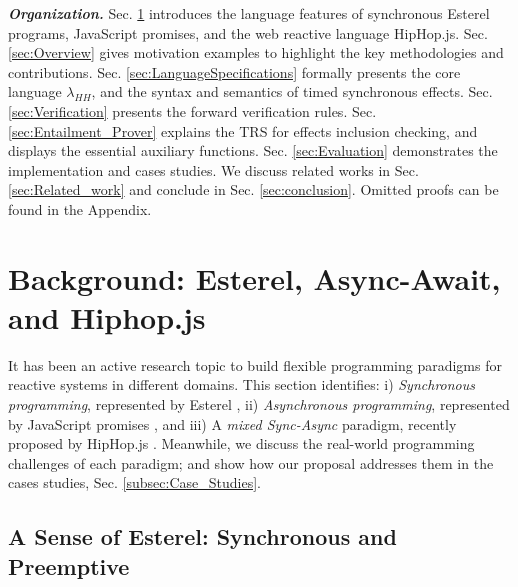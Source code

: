 \documentclass[acmsmall,review,anonymous]{acmart}\settopmatter{printfolios=true,printccs=false,printacmref=false}
\newcommand{\code}[1]{{\tt{\ensuremath{\m{#1}}}}}
\newcommand{\m}{\mathit}
\newcommand\secref[1]{Sec. \textcolor{black}{\ref{#1}}}
\begin{document}
\noindent\textbf{\textit{Organization.}} 
\secref{sec:Preliminaries} introduces the language features of synchronous Esterel programs, JavaScript promises, and the web reactive language HipHop.js. 
\secref{sec:Overview} gives motivation examples to highlight the key methodologies and contributions. 
\secref{sec:LanguageSpecifications} formally presents the core   language \code{\lambda_{HH}}, and the syntax and semantics of timed synchronous effects.
\secref{sec:Verification} presents the forward verification rules.
\secref{sec:Entailment_Prover} explains the TRS for effects inclusion checking, and displays the essential auxiliary functions. 
\secref{sec:Evaluation} demonstrates the implementation and cases studies. %
We discuss related works in \secref{sec:Related_work} and conclude in  \secref{sec:conclusion}. Omitted proofs can be found in the Appendix.


\section{Background: Esterel, Async-Await, and Hiphop.js }
\label{sec:Preliminaries}

It has been an active research topic to build flexible programming paradigms for reactive systems in different domains. This section identifies: i) \emph{Synchronous programming}, represented by Esterel  \cite{berry1992esterel}, ii) \emph{Asynchronous programming}, represented by JavaScript promises \cite{madsen2017model}, and iii) A \emph{mixed Sync-Async} paradigm, recently proposed by HipHop.js  \cite{berry2020hiphop}. Meanwhile, we discuss the real-world programming challenges of each paradigm; and show how our proposal addresses them in the cases studies, \secref{subsec:Case_Studies}. 

 
 





\subsection{A Sense of Esterel: Synchronous and Preemptive}

\end{document}
